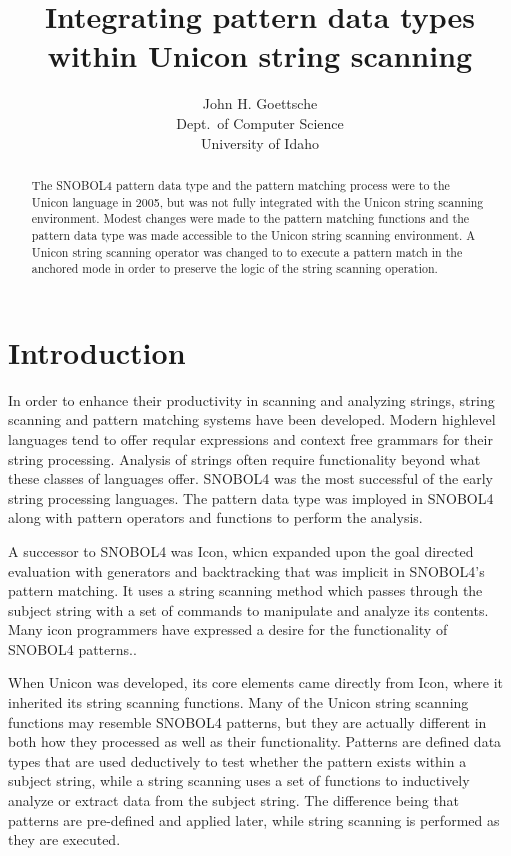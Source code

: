 \documentclass{article}
\begin{document}
\title{Integrating pattern data types within Unicon string scanning}
\author{John H. Goettsche\\
  Dept.\ of Computer Science\\
  University of Idaho}

\maketitle



\begin{abstract}
The SNOBOL4 pattern data type and the pattern matching process were to the Unicon language in 2005, but was not fully integrated with the Unicon string scanning environment.  Modest changes were made to the pattern matching functions and the pattern data type was made accessible to the Unicon string scanning environment.  A Unicon string scanning operator was changed to to execute a pattern match in the anchored mode in order to preserve the logic of the string scanning operation. 

\end{abstract}

\pagebreak
\tableofcontents

\pagebreak
\section{Introduction}
In order to enhance their productivity in scanning and analyzing strings, string scanning and pattern matching systems have been developed.  Modern highlevel languages tend to offer reqular expressions and context free grammars for their string processing.  Analysis of strings often require functionality beyond what these classes of languages offer.  SNOBOL4 was the most successful of the early string processing languages.\cite{Gaikaiwari2005}  The pattern data type was imployed in SNOBOL4 along with pattern operators and functions to perform the analysis.

A successor to SNOBOL4 was Icon, whicn expanded upon the goal directed evaluation with generators and backtracking that was implicit in SNOBOL4's pattern matching.\cite{Gaikaiwari2005}  It uses a string scanning method which passes through the subject string with a set of commands to manipulate and analyze its contents.  Many icon programmers have expressed a desire for the functionality of SNOBOL4 patterns.\cite{Griswold1980}.

When Unicon was developed, its core elements came directly from Icon, where it inherited its string scanning functions.\cite{JefferyUnicon}  Many of the Unicon string scanning functions may resemble SNOBOL4 patterns, but they are actually different in both how they processed as well as their functionality.  Patterns are defined data types that are used deductively to test whether the pattern exists within a subject string, while a string scanning uses a set of functions to inductively analyze or extract data from the subject string.  The difference being that patterns are pre-defined and applied later, while string scanning is performed as they are executed.
\end{document}

